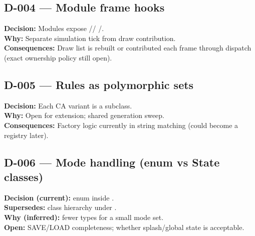 \subsection*{D-004 --- Module frame hooks}
\begin{decisionbox}[title={D-004 \quad inferred from IModule}]
\textbf{Decision:} Modules expose //
/.\\
\textbf{Why:} Separate simulation tick from draw contribution.\\
\textbf{Consequences:} Draw list is rebuilt or contributed each frame through
dispatch (exact ownership policy still open).
\end{decisionbox}

\subsection*{D-005 --- Rules as polymorphic sets}
\begin{decisionbox}[title={D-005 \quad inferred}]
\textbf{Decision:} Each CA variant is a  subclass.\\
\textbf{Why:} Open for extension; shared generation sweep.\\
\textbf{Consequences:} Factory logic currently in 
string matching (could become a registry later).
\end{decisionbox}

\subsection*{D-006 --- Mode handling (enum vs State classes)}
\begin{decisionbox}[title={D-006 \quad current code; author may supersede}]
\textbf{Decision (current):}  enum inside
.\\
\textbf{Supersedes:} class hierarchy under .\\
\textbf{Why (inferred):} fewer types for a small mode set.\\
\textbf{Open:} SAVE/LOAD completeness; whether splash/global state is acceptable.
\end{decisionbox}

